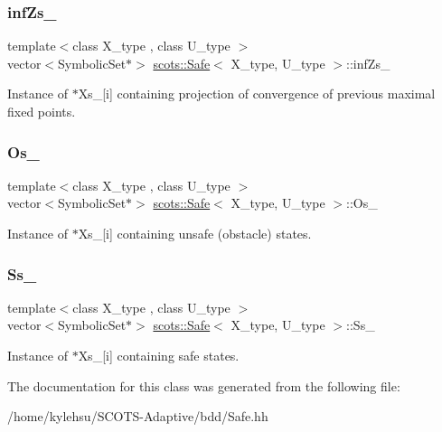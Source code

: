 \subsubsection{\texorpdfstring{inf\+Zs\+\_\+}{infZs\_}}
{\footnotesize\ttfamily template$<$class X\+\_\+type , class U\+\_\+type $>$ \\
vector$<$Symbolic\+Set$\ast$$>$ \hyperlink{classscots_1_1Safe}{scots\+::\+Safe}$<$ X\+\_\+type, U\+\_\+type $>$\+::inf\+Zs\+\_\+}

Instance of $\ast$\+Xs\+\_\+\mbox{[}i\mbox{]} containing projection of convergence of previous maximal fixed points. \mbox{\label{classscots_1_1Safe_a14fd7c2c700e6a4ea5d6d169febd4289}} 
\subsubsection{\texorpdfstring{Os\+\_\+}{Os\_}}
{\footnotesize\ttfamily template$<$class X\+\_\+type , class U\+\_\+type $>$ \\
vector$<$Symbolic\+Set$\ast$$>$ \hyperlink{classscots_1_1Safe}{scots\+::\+Safe}$<$ X\+\_\+type, U\+\_\+type $>$\+::Os\+\_\+}

Instance of $\ast$\+Xs\+\_\+\mbox{[}i\mbox{]} containing unsafe (obstacle) states. \mbox{\label{classscots_1_1Safe_a4c272a1e134f26e88c74a08c2703d934}} 
\subsubsection{\texorpdfstring{Ss\+\_\+}{Ss\_}}
{\footnotesize\ttfamily template$<$class X\+\_\+type , class U\+\_\+type $>$ \\
vector$<$Symbolic\+Set$\ast$$>$ \hyperlink{classscots_1_1Safe}{scots\+::\+Safe}$<$ X\+\_\+type, U\+\_\+type $>$\+::Ss\+\_\+}

Instance of $\ast$\+Xs\+\_\+\mbox{[}i\mbox{]} containing safe states. 

The documentation for this class was generated from the following file\+:\begin{DoxyCompactItemize}
\item 
/home/kylehsu/\+S\+C\+O\+T\+S-\/\+Adaptive/bdd/Safe.\+hh\end{DoxyCompactItemize}
